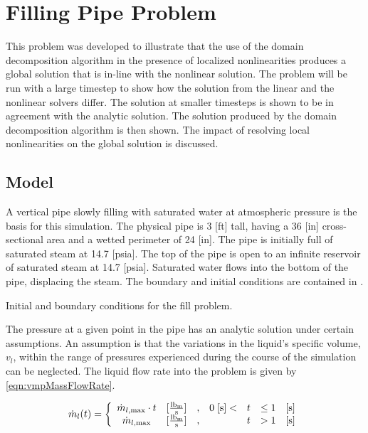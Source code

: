 \section{Filling Pipe Problem}
\label{sect:vmp}
This problem was developed to illustrate that the use of the domain decomposition algorithm in the presence of localized nonlinearities produces a global solution that is in-line with the nonlinear solution.
The problem will be run with a large timestep to show how the solution from the linear and the nonlinear solvers differ.
The solution at smaller timesteps is shown to be in agreement with the analytic solution.
The solution produced by the domain decomposition algorithm is then shown.
The impact of resolving local nonlinearities on the global solution is discussed.

\subsection{Model}
\label{subsect:vmpModel}

A vertical pipe slowly filling with saturated water at atmospheric pressure is the basis for this simulation.
The physical pipe is 3 [ft] tall, having a 36 [in] cross-sectional area and a wetted perimeter of 24 [in].
The pipe is initially full of saturated steam at 14.7 [psia].
The top of the pipe is open to an infinite reservoir of saturated steam at 14.7 [psia].
Saturated water flows into the bottom of the pipe, displacing the steam.
The boundary and initial conditions are contained in .

\begin{table}[ht]
\centering
\singlespace

\caption{Initial and boundary conditions for the fill problem.}
\label{tab:vmpBCIC}
\end{table}

The pressure at a given point in the pipe has an analytic solution under certain assumptions.
An assumption is that the variations in the liquid's specific volume, $v_{l}$, within the range of pressures experienced during the course of the simulation can be neglected.
The liquid flow rate into the problem is given by \eqref{eqn:vmpMassFlowRate}.

\begin{equation}
\label{eqn:vmpMassFlowRate}
\dot{m}_{l}(t) = \left\{
\begin{array}{cclrcll}
 \dot{m}_{l,\text{max}}\cdot t & [\frac{ \lbm{} }{\text{s}}] & , & 0\; [\text{s}] < & t & \leq 1 & [\text{s}] \\
 \dot{m}_{l,\text{max}}        & [\frac{ \lbm{} }{\text{s}}] & , &                  & t & > 1    & [\text{s}]
\end{array}\right.
\end{equation}


